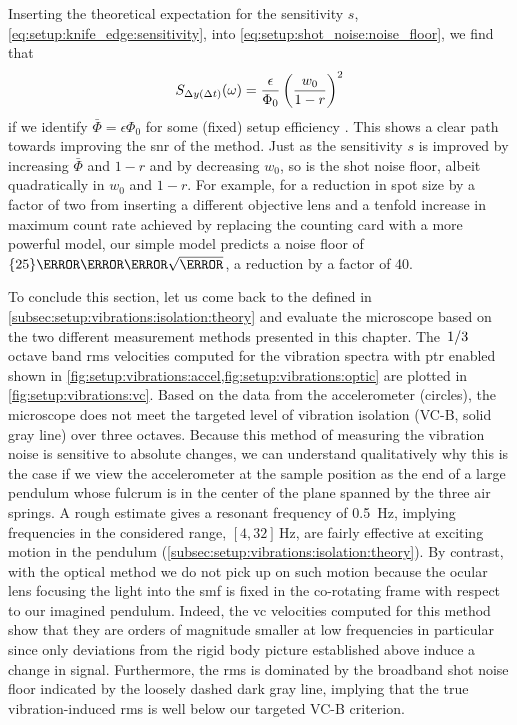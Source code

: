 Inserting the theoretical expectation for the sensitivity $s$, \cref{eq:setup:knife_edge:sensitivity}, into \cref{eq:setup:shot_noise:noise_floor}, we find that
\begin{equation}\label{eq:setup:shot_noise:noise_floor2}
    S_{\Delta y(\Delta t)}(\omega) = \frac{\epsilon}{\Phi_0}\left(\frac{w_0}{1-r}\right)^2
\end{equation}
if we identify $\bar{\Phi} = \epsilon\Phi_0$ for some (fixed) setup efficiency \eps.
This shows a clear path towards improving the \gls{snr} of the method.
Just as the sensitivity $s$ is improved by increasing $\bar{\Phi}$ and $1-r$ and by decreasing $w_0$, so is the shot noise floor, albeit quadratically in $w_0$ and $1-r$.
For example, for a reduction in spot size by a factor of two from inserting a different objective lens and a tenfold increase in maximum count rate achieved by replacing the counting card with a more powerful model,
our simple model predicts a noise floor of $\qty{25}{\pico\meter\per\sqrt{\hertz}}$, a reduction by a factor of \num{40}.

To conclude this section, let us come back to the  defined in \cref{subsec:setup:vibrations:isolation:theory} and evaluate the microscope based on the two different measurement methods presented in this chapter.
The $\flatfrac{1}{3}$ octave band \gls{rms} velocities computed for the vibration spectra with \gls{ptr} enabled shown in \cref{fig:setup:vibrations:accel,fig:setup:vibrations:optic} are plotted in \cref{fig:setup:vibrations:vc}.
Based on the data from the accelerometer (circles), the microscope does not meet the targeted level of vibration isolation (VC-B, solid gray line) over three octaves.
Because this method of measuring the vibration noise is sensitive to absolute changes, we can understand qualitatively why this is the case if we view the accelerometer at the sample position as the end of a large pendulum whose fulcrum is in the center of the plane spanned by the three air springs.
A rough estimate gives a resonant frequency of \qty{0.5}{\hertz},
implying frequencies in the considered range, $[4, 32]\,\unit{\hertz}$, are fairly effective at exciting motion in the pendulum (\cf \cref{subsec:setup:vibrations:isolation:theory}).
By contrast, with the optical method we do not pick up on such motion because the ocular lens focusing the light into the \gls{smf} is fixed in the co-rotating frame with respect to our imagined pendulum.
Indeed, the \gls{vc} velocities computed for this method show that they are orders of magnitude smaller at low frequencies in particular since only deviations from the rigid body picture established above induce a change in signal.
Furthermore, the \gls{rms} is dominated by the broadband shot noise floor indicated by the loosely dashed dark gray line, implying that the true vibration-induced \gls{rms} is well below our targeted VC-B criterion.

